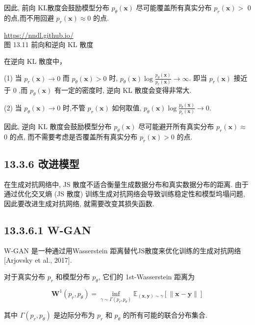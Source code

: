\documentclass[10pt]{article}
\begin{document}
因此, 前向 KL散度会鼓励模型分布 $p_{\theta}(\boldsymbol{x})$ 尽可能覆盖所有真实分布 $p_{r}(\boldsymbol{x})>$ 0 的点,而不用回避 $p_{r}(\boldsymbol{x}) \approx 0$ 的点.

\href{https://nndl.github.io/}{https://nndl.github.io/}\\


图 13.11 前向和逆向 KL 散度

在逆向 KL 散度中，

(1) 当 $p_{r}(\boldsymbol{x}) \rightarrow 0$ 而 $p_{\theta}(\boldsymbol{x})>0$ 时, $p_{\theta}(\boldsymbol{x}) \log \frac{p_{\theta}(\boldsymbol{x})}{p_{r}(\boldsymbol{x})} \rightarrow \infty$. 即当 $p_{r}(\boldsymbol{x})$ 接近于 0 ,而 $p_{\theta}(\boldsymbol{x})$ 有一定的密度时, 逆向 KL 散度会变得非常大.

(2) 当 $p_{\theta}(\boldsymbol{x}) \rightarrow 0$ 时,不管 $p_{r}(\boldsymbol{x})$ 如何取值, $p_{\theta}(\boldsymbol{x}) \log \frac{p_{\theta}(\boldsymbol{x})}{p_{r}(\boldsymbol{x})} \rightarrow 0$.

因此, 逆向 $\mathrm{KL}$ 散度会鼓励模型分布 $p_{\theta}(\boldsymbol{x})$ 尽可能避开所有真实分布 $p_{r}(\boldsymbol{x}) \approx$ 0 的点, 而不需要考虑是否覆盖所有真实分布 $p_{r}(\boldsymbol{x})>0$ 的点.

\subsection*{13.3.6 改进模型}
在生成对抗网络中, JS 散度不适合衡量生成数据分布和真实数据分布的距离. 由于通过优化交叉熵 (JS 散度) 训练生成对抗网络会导致训练稳定性和模型坞塌问题,因此要改进生成对抗网络, 就需要改变其损失函数.

\subsection*{13.3.6.1 W-GAN}
W-GAN 是一种通过用Wasserstein 距离替代JS散度来优化训练的生成对抗网络 [Arjovsky et al., 2017].

对于真实分布 $p_{r}$ 和模型分布 $p_{\theta}$, 它们的 1st-Wasserstein 距离为


\begin{equation*}
\boldsymbol{W}^{1}\left(p_{r}, p_{\theta}\right)=\inf _{\gamma \sim \Gamma\left(p_{r}, p_{\theta}\right)} \mathbb{E}_{(\boldsymbol{x}, \boldsymbol{y}) \sim \gamma}[\|\boldsymbol{x}-\boldsymbol{y}\|] \tag{13.50}
\end{equation*}


其中 $\Gamma\left(p_{r}, p_{\theta}\right)$ 是边际分布为 $p_{r}$ 和 $p_{\theta}$ 的所有可能的联合分布集合.
\end{document}
